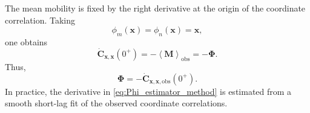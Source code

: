 \documentclass[11pt,twoside,fleqn]{article}
\begin{document}
The mean mobility is fixed by the right derivative at the origin of the
coordinate correlation. Taking
\begin{equation}
    \phi_m(\bm{x})=\phi_n(\bm{x})=\bm{x},
    \label{eq:coordinate_observable_choice_method}
\end{equation}
one obtains
\begin{equation}
    \dot{\bm{C}}_{\bm{x},\bm{x}}(0^+)
    =
    -
    \left\langle
        \bm{M}
    \right\rangle_{\mathrm{obs}}
    =
    -
    \bm{\Phi}.
    \label{eq:Phi_from_Cdot_zero_method}
\end{equation}
Thus,
\begin{equation}
    \bm{\Phi}
    =
    -
    \dot{\bm{C}}_{\bm{x},\bm{x},\mathrm{obs}}(0^+).
    \label{eq:Phi_estimator_method}
\end{equation}
In practice, the derivative in \eqref{eq:Phi_estimator_method} is estimated from a smooth short-lag fit of the observed coordinate correlations.
\end{document}
